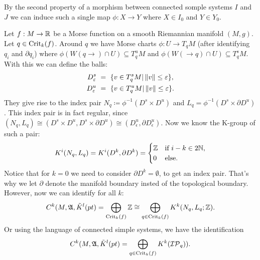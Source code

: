 \begin{remark}
	By the second property of a morphism between connected somple systems $I$ and $J$ we can induce such a single map $\phi:X\to Y$ where $X\in I_0$ and $Y\in Y_0$. 
\end{remark}

\begin{remark} \label{ex: Critical points as isolated compact invariant subsets}
	Let ${f:M\to \mathbb{R}}$ be a Morse function on a smooth Riemannian manifold $(M,g)$. Let $q\in \mathrm{Crit}_k(f)$. Around $q$ we have Morse charts $\phi:U \to T_qM$ (after identifying $q_i$ and $\partial q_i$) where  ${\phi(W(q\to)\cap U)\subseteq T_q^{u}M}$ and ${\phi(W(\to q)\cap U)\subseteq T_q^{s}M}$. With this we can define the balls:
	\begin{align*}
		D^{s}_\varepsilon &~=~\{v\in T_q^{s}M | \left\lVert v\right\rVert\leq \varepsilon \}, \\
		D^{u}_\varepsilon &~=~\{v\in T_q^{u }M | \left\lVert v\right\rVert\leq \varepsilon \}. 
	\end{align*} They give rise to the index pair $N_q\coloneq\phi^{-1}( D^{s }\times  D^{u })$ and $L_q=\phi^{-1}( D^{ s}\times \partial D^{u})$. This index pair is in fact regular, since $(N_q,L_q)\cong  (D^{ s}\times  D^{u }, D^{s}\times \partial D^{u}) \cong (D^{u}_{\epsilon},\partial D^{u}_{\epsilon} )$. Now we know the K-group of such a pair:
	\begin{align} \label{eq: homology of indexx pair of critical point}
		K^i(N_q,L_q)=K^i(D^{k},\partial D^{k})=\begin{cases}
			\mathbb{Z} & \text{if } i-k\in 2\mathbb{N},\\
			0& \text{else. }
		\end{cases}
	\end{align}
	Notice that for $k=0$ we need to consider $\partial D^k=\emptyset$, to get an index pair. That's why we let $\partial$ denote the manifold boundary insted of the topological boundary. However, now we can identify for all $k$: \begin{equation} \label{ kritical points as direct sum of homology groups}
		C^{k}(M,\mathfrak{A},\tilde{K}^{l}(pt)=\bigoplus_{ \mathrm{Crit}_k(f)} \mathbb{Z} \cong \bigoplus_{q\in \mathrm{Crit}_k(f)} K^k(N_q,L_q;\mathbb{Z}).
	\end{equation}
	Or using the language of connected simple systems, we have the identification 
	\begin{equation} 
		C^{k}(M,\mathfrak{A},\tilde{K}^{l}(pt)= \bigoplus_{q\in \mathrm{Crit}_k(f)} K^k(\mathcal{IP}_q)).
	\end{equation}
\end{remark}

